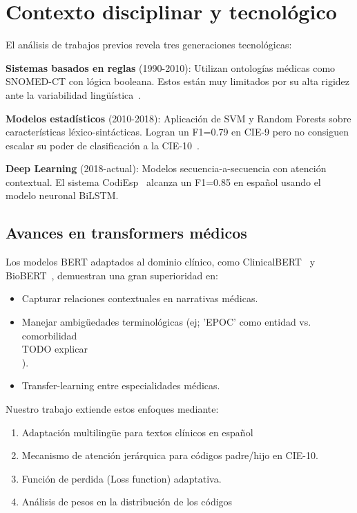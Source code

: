 \section{Contexto disciplinar y tecnológico}

El análisis de trabajos previos revela tres generaciones tecnológicas:

\textbf{Sistemas basados en reglas} (1990-2010): Utilizan ontologías médicas como SNOMED-CT con lógica booleana. Estos están muy limitados por su alta rigidez ante la variabilidad lingüística~\cite{aronson2011}.

\textbf{Modelos estadísticos} (2010-2018): Aplicación de SVM y Random Forests sobre características léxico-sintácticas. Logran un F1=0.79 en CIE-9 pero no consiguen escalar su poder de clasificación a la CIE-10~\cite{liu2018}.

\textbf{Deep Learning} (2018-actual): Modelos secuencia-a-secuencia con atención contextual. El sistema CodiEsp~\cite{miranda2020} alcanza un F1=0.85 en español usando el modelo neuronal BiLSTM.

\subsection{Avances en transformers médicos}
Los modelos BERT adaptados al dominio clínico, como ClinicalBERT~\cite{alsentzer2019} y BioBERT~\cite{lee2020}, demuestran una gran superioridad en:

\begin{itemize}
\item Capturar relaciones contextuales en narrativas médicas.
\item Manejar ambigüedades terminológicas (ej; 'EPOC' como entidad vs. comorbilidad \\TODO explicar\\).
\item Transfer-learning entre especialidades médicas.
\end{itemize}

Nuestro trabajo extiende estos enfoques mediante:
\begin{enumerate}
\item Adaptación multilingüe para textos clínicos en español
\item Mecanismo de atención jerárquica para códigos padre/hijo en CIE-10.
\item Función de perdida (Loss function) adaptativa.
\item Análisis de pesos en la distribución de los códigos
\end{enumerate}

